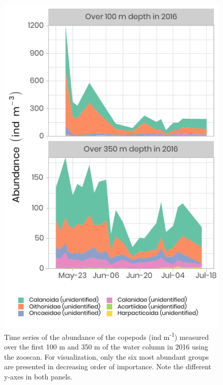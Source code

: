 \documentclass[12pt,a4paper]{scrartcl}
\begin{document}
\begin{figure}[h]
	\centering
	\includegraphics[scale = 1]{../../../graphs/fig14.pdf}
	\caption{Time series of the abundance of the copepods (ind m\textsuperscript{-1}) measured over the first 100 m and 350 m of the water column in 2016 using the zooscan. For visualization, only the six most abundant groups are presented in decreasing order of importance. Note the different y-axes in both panels.}
\end{figure}
\end{document}
